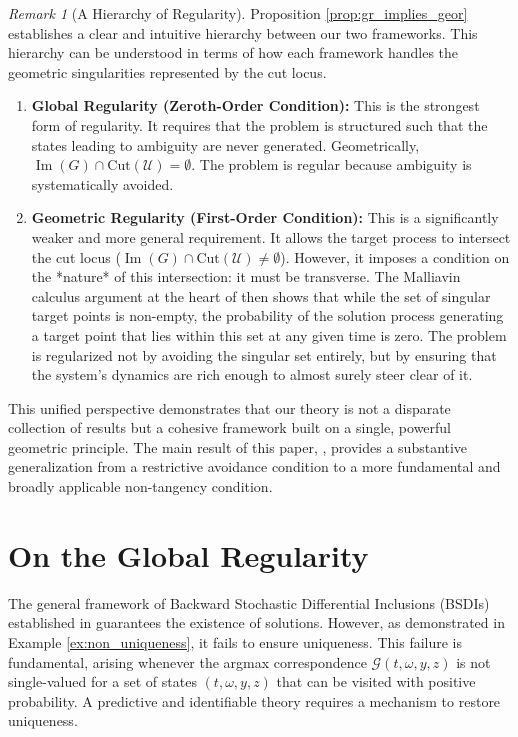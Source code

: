 \documentclass[12pt, letterpaper]{amsart}
\newcommand{\Ucal}{\mathcal{U}}
\DeclareMathOperator{\Image}{Im}
\theoremstyle{plain}
\theoremstyle{definition}
\theoremstyle{remark}
\newtheorem{remark}[theorem]{Remark}
\numberwithin{equation}{section} %
\begin{document}
\begin{remark}[A Hierarchy of Regularity]
\label{rem:hierarchy}
Proposition \ref{prop:gr_implies_geor} establishes a clear and intuitive hierarchy between our two frameworks. This hierarchy can be understood in terms of how each framework handles the geometric singularities represented by the cut locus.

\begin{enumerate}
    \item \textbf{Global Regularity (Zeroth-Order Condition):} This is the strongest form of regularity. It requires that the problem is structured such that the states leading to ambiguity are never generated. Geometrically, \(\Image(G) \cap \mathrm{Cut}(\Ucal) = \emptyset\). The problem is regular because ambiguity is systematically avoided.

    \item \textbf{Geometric Regularity (First-Order Condition):} This is a significantly weaker and more general requirement. It allows the target process to intersect the cut locus (\(\Image(G) \cap \mathrm{Cut}(\Ucal) \neq \emptyset\)). However, it imposes a condition on the *nature* of this intersection: it must be transverse. The Malliavin calculus argument at the heart of  then shows that while the set of singular target points is non-empty, the probability of the solution process generating a target point that lies within this set at any given time is zero. The problem is regularized not by avoiding the singular set entirely, but by ensuring that the system's dynamics are rich enough to almost surely steer clear of it.
\end{enumerate}
This unified perspective demonstrates that our theory is not a disparate collection of results but a cohesive framework built on a single, powerful geometric principle. The main result of this paper, , provides a substantive generalization from a restrictive avoidance condition to a more fundamental and broadly applicable non-tangency condition.
\end{remark}

\section{On the Global Regularity}
\label{sec:wellposedness_global_regularity}

The general framework of Backward Stochastic Differential Inclusions (BSDIs) established in  guarantees the existence of solutions. However, as demonstrated in Example \ref{ex:non_uniqueness}, it fails to ensure uniqueness. This failure is fundamental, arising whenever the argmax correspondence $\mathcal{G}(t,\omega,y,z)$ is not single-valued for a set of states $(t,\omega,y,z)$ that can be visited with positive probability. A predictive and identifiable theory requires a mechanism to restore uniqueness.
\end{document}

